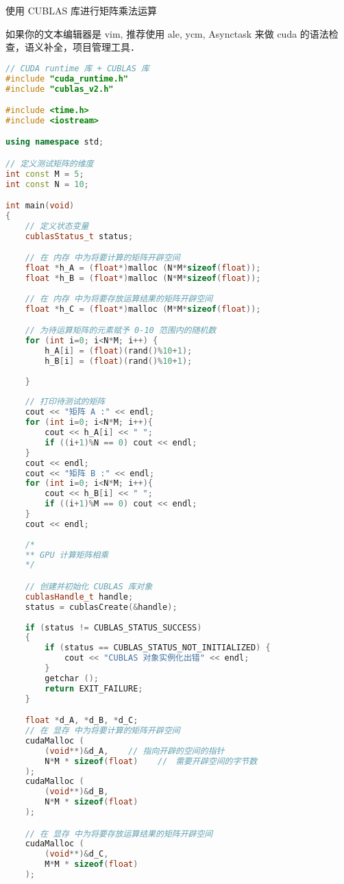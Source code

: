 使用 CUBLAS 库进行矩阵乘法运算

如果你的文本编辑器是 vim, 推荐使用 ale, ycm, Asynctask 来做 cuda 的语法检查，语义补全，项目管理工具．
\begin{lstlisting}[language=cpp, caption=cublas\_demo.cu]
// CUDA runtime 库 + CUBLAS 库 
#include "cuda_runtime.h"
#include "cublas_v2.h"

#include <time.h>
#include <iostream>

using namespace std;

// 定义测试矩阵的维度
int const M = 5;
int const N = 10;

int main(void) 
{   
    // 定义状态变量
    cublasStatus_t status;

    // 在 内存 中为将要计算的矩阵开辟空间
    float *h_A = (float*)malloc (N*M*sizeof(float));
    float *h_B = (float*)malloc (N*M*sizeof(float));
    
    // 在 内存 中为将要存放运算结果的矩阵开辟空间
    float *h_C = (float*)malloc (M*M*sizeof(float));

    // 为待运算矩阵的元素赋予 0-10 范围内的随机数
    for (int i=0; i<N*M; i++) {
        h_A[i] = (float)(rand()%10+1);
        h_B[i] = (float)(rand()%10+1);
    
    }
    
    // 打印待测试的矩阵
    cout << "矩阵 A :" << endl;
    for (int i=0; i<N*M; i++){
        cout << h_A[i] << " ";
        if ((i+1)%N == 0) cout << endl;
    }
    cout << endl;
    cout << "矩阵 B :" << endl;
    for (int i=0; i<N*M; i++){
        cout << h_B[i] << " ";
        if ((i+1)%M == 0) cout << endl;
    }
    cout << endl;
    
    /*
    ** GPU 计算矩阵相乘
    */

    // 创建并初始化 CUBLAS 库对象
    cublasHandle_t handle;
    status = cublasCreate(&handle);
    
    if (status != CUBLAS_STATUS_SUCCESS)
    {
        if (status == CUBLAS_STATUS_NOT_INITIALIZED) {
            cout << "CUBLAS 对象实例化出错" << endl;
        }
        getchar ();
        return EXIT_FAILURE;
    }

    float *d_A, *d_B, *d_C;
    // 在 显存 中为将要计算的矩阵开辟空间
    cudaMalloc (
        (void**)&d_A,    // 指向开辟的空间的指针
        N*M * sizeof(float)    //　需要开辟空间的字节数
    );
    cudaMalloc (
        (void**)&d_B,    
        N*M * sizeof(float)    
    );

    // 在 显存 中为将要存放运算结果的矩阵开辟空间
    cudaMalloc (
        (void**)&d_C,
        M*M * sizeof(float)    
    );


\end{lstlisting}
